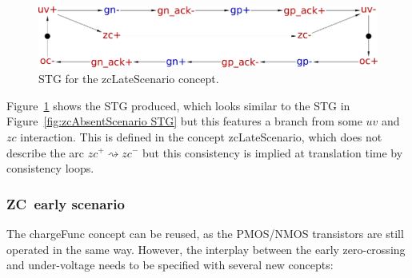 \documentclass[british,compsoc]{IEEEtran}
\begin{document}
\begin{figure}[H]
\begin{centering}
\includegraphics[scale=0.22]{Images/stg-UV_before_ZC}
\par\end{centering}

\protect\caption{\label{fig:zcLateScenario STG}STG for the \textsf{zcLateScenario}
concept.}

\end{figure}

Figure~\ref{fig:zcLateScenario STG} shows the STG produced, which
looks similar to the STG in Figure~\ref{fig:zcAbsentScenario STG}
but this features a branch from some $uv$ and $zc$ interaction.
This is defined in the concept \textsf{zcLateScenario}, which does
not describe the arc $zc^{+}\rightsquigarrow zc^{-}$ but this consistency
is implied at translation time by consistency loops.

\subsubsection{ZC~early scenario}

The \textsf{chargeFunc} concept can be reused, as the PMOS/NMOS transistors
are still operated in the same way. However, the interplay between
the early zero-crossing and under-voltage needs to be specified with
several new concepts:
\end{document}
